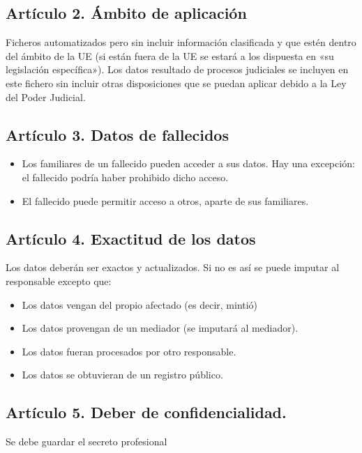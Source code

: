 \documentclass[letterpaper,10pt,spanish]{sphinxmanual}
\begin{document}
\subsection{Artículo 2. Ámbito de aplicación}
\label{\detokenize{tema_lopd/tema_lopd:articulo-2-ambito-de-aplicacion}}
Ficheros automatizados pero sin incluir información clasificada y que estén dentro del ámbito de la UE (si están fuera de la UE se estará a los dispuesta en «su legislación específica»). Los datos resultado de procesos judiciales se incluyen en este fichero sin incluir otras disposiciones que se puedan aplicar debido a la Ley del Poder Judicial.


\subsection{Artículo 3. Datos de fallecidos}
\label{\detokenize{tema_lopd/tema_lopd:articulo-3-datos-de-fallecidos}}\begin{itemize}
\item {} 
Los familiares de un fallecido pueden acceder a sus datos. Hay una excepción: el fallecido podría haber prohibido dicho acceso.

\item {} 
El fallecido puede permitir acceso a otros, aparte de sus familiares.

\end{itemize}


\subsection{Artículo 4. Exactitud de los datos}
\label{\detokenize{tema_lopd/tema_lopd:articulo-4-exactitud-de-los-datos}}
Los datos deberán ser exactos y actualizados. Si no es así se puede imputar al responsable excepto que:
\begin{itemize}
\item {} 
Los datos vengan del propio afectado (es decir, mintió)

\item {} 
Los datos provengan de un mediador (se imputará al mediador).

\item {} 
Los datos fueran procesados por otro responsable.

\item {} 
Los datos se obtuvieran de un registro público.

\end{itemize}


\subsection{Artículo 5. Deber de confidencialidad.}
\label{\detokenize{tema_lopd/tema_lopd:articulo-5-deber-de-confidencialidad}}
Se debe guardar el secreto profesional 
\end{document}
